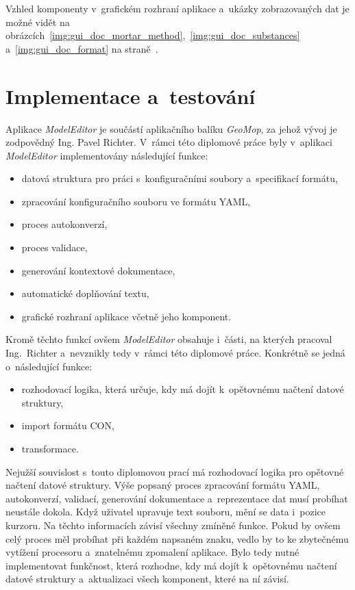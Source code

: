\documentclass[FM,bw,DP]{tulthesis}
\begin{document}
Vzhled komponenty v~grafickém rozhraní aplikace a~ukázky zobrazovaných dat je možné vidět na obrázcích~\ref{img:gui_doc_mortar_method},~\ref{img:gui_doc_substances} a~\ref{img:gui_doc_format} na straně~\pageref{img:gui_doc_mortar_method}.


\chapter{Implementace a~testování}

Aplikace \textit{ModelEditor} je součástí aplikačního balíku \textit{GeoMop}, za jehož vývoj je zodpovědný Ing. Pavel Richter. V~rámci této diplomové práce byly v~aplikaci \textit{ModelEditor} implementovány následující funkce:

\begin{itemize}
\item datová struktura pro práci s~konfiguračními soubory a~specifikací formátu,
\item zpracování konfiguračního souboru ve formátu \gls{YAML},
\item proces autokonverzí,
\item proces validace,
\item generování kontextové dokumentace,
\item automatické doplňování textu,
\item grafické rozhraní aplikace včetně jeho komponent.
\end{itemize}

Kromě těchto funkcí ovšem \textit{ModelEditor} obsahuje i~části, na kterých pracoval Ing.~Richter a~nevznikly tedy v~rámci této diplomové práce. Konkrétně se jedná o~následující funkce:

\begin{itemize}
\item rozhodovací logika, která určuje, kdy má dojít k~opětovnému načtení datové struktury,
\item import formátu \gls{CON},
\item transformace.
\end{itemize}

Nejužší souvislost s~touto diplomovou prací má rozhodovací logika pro opětovné načtení datové struktury. Výše popsaný proces zpracování formátu \gls{YAML}, autokonverzí, validací, generování dokumentace a~reprezentace dat musí probíhat neustále dokola. Když uživatel upravuje text souboru, mění se data i~pozice kurzoru. Na těchto informacích závisí všechny zmíněné funkce. Pokud by ovšem celý proces měl probíhat při každém napsaném znaku, vedlo by to ke zbytečnému vytížení procesoru a~znatelnému zpomalení aplikace. Bylo tedy nutné implementovat funkčnost, která rozhodne, kdy má dojít k~opětovnému načtení datové struktury a~aktualizaci všech komponent, které na ní závisí.
\end{document}
